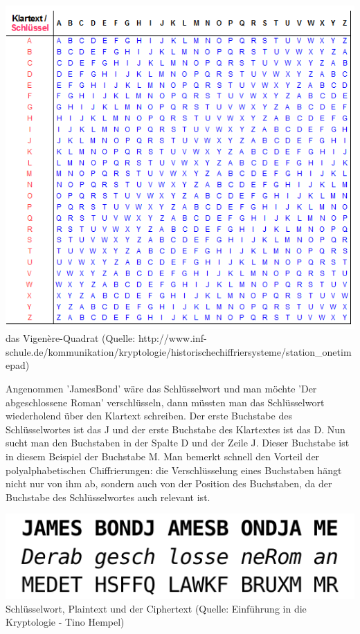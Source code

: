 \documentclass[12pt,a4paper]{report}
\begin{document}
\begin{center}
\includegraphics[scale=0.5]{img/vigere_quadrat.png}\\
das Vigenère-Quadrat (Quelle: http://www.inf-schule.de/kommunikation/kryptologie/historischechiffriersysteme/station\_onetimepad)
\end{center}

Angenommen 'JamesBond' wäre das Schlüsselwort und man möchte 'Der abgeschlossene Roman' verschlüsseln, dann müssten man das Schlüsselwort wiederholend über den Klartext schreiben. Der erste Buchstabe des Schlüsselwortes ist das J und der erste Buchstabe des Klartextes ist das D. Nun sucht man den Buchstaben in der Spalte D und der Zeile J. Dieser Buchstabe ist in diesem Beispiel der Buchstabe M. Man bemerkt schnell den Vorteil der polyalphabetischen Chiffrierungen: die Verschlüsselung eines Buchstaben hängt nicht nur von ihm ab, sondern auch von der Position des Buchstaben, da der Buchstabe des Schlüsselwortes auch relevant ist.

\begin{center}
\includegraphics[scale=0.5]{img/vingere.png}\\
Schlüsselwort, Plaintext und der Ciphertext (Quelle: Einführung in die Kryptologie - Tino Hempel)
\end{center}
\end{document}
